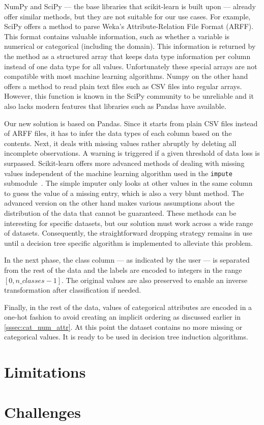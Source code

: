 NumPy and SciPy --- the base libraries that scikit-learn is built upon --- already offer similar methods, but they are not suitable for our use cases. For example, SciPy offers a method to parse Weka's Attribute-Relation File Format (ARFF). This format contains valuable information, such as whether a variable is numerical or categorical (including the domain). This information is returned by the method as a structured array that keeps data type information per column instead of one data type for all values. Unfortunately these special arrays are not compatible with most machine learning algorithms. Numpy on the other hand offers a method to read plain text files such as CSV files into regular arrays. However, this function is known in the SciPy community to be unreliable and it also lacks modern features that libraries such as Pandas have available.

Our new solution is based on Pandas. Since it starts from plain CSV files instead of ARFF files, it has to infer the data types of each column based on the contents. Next, it deals with missing values rather abruptly by deleting all incomplete observations. A warning is triggered if a given threshold of data loss is surpassed. Scikit-learn offers more advanced methods of dealing with missing values independent of the machine learning algorithm used in the \texttt{impute} submodule~\cite{imputation}. The simple imputer only looks at other values in the same column to guess the value of a missing entry, which is also a very blunt method. The advanced version on the other hand makes various assumptions about the distribution of the data that cannot be guaranteed. These methods can be interesting for specific datasets, but our solution must work across a wide range of datasets. Consequently, the straightforward dropping strategy remains in use until a decision tree specific algorithm is implemented to alleviate this problem.

In the next phase, the class column --- as indicated by the user --- is separated from the rest of the data and the labels are encoded to integers in the range $[0, n\_classes - 1]$. The original values are also preserved to enable an inverse transformation after classification if needed. 

Finally, in the rest of the data, values of categorical attributes are encoded in a one-hot fashion to avoid creating an implicit ordering as discussed earlier in \autoref{sssec:cat_num_attr}. At this point the dataset contains no more missing or categorical values. It is ready to be used in decision tree induction algorithms.


\section{Limitations}

\section{Challenges}
